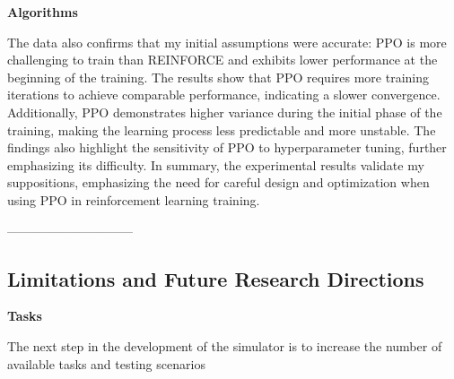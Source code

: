 \begin{textblock}
{\bf Algorithms }

The data also confirms that my initial assumptions were accurate: PPO is more challenging to train than REINFORCE and exhibits lower performance at the beginning of the training. The results show that PPO requires more training iterations to achieve comparable performance, indicating a slower convergence. Additionally, PPO demonstrates higher variance during the initial phase of the training, making the learning process less predictable and more unstable. The findings also highlight the sensitivity of PPO to hyperparameter tuning, further emphasizing its difficulty. In summary, the experimental results validate my suppositions, emphasizing the need for careful design and optimization when using PPO in reinforcement learning training.
\end{textblock}



 ------------------------------ %

\subsection{Limitations and Future Research Directions}


\begin{textblock}
{\bf Tasks }

The next step in the development of the simulator is to increase the number of available tasks and testing scenarios
\end{textblock}


